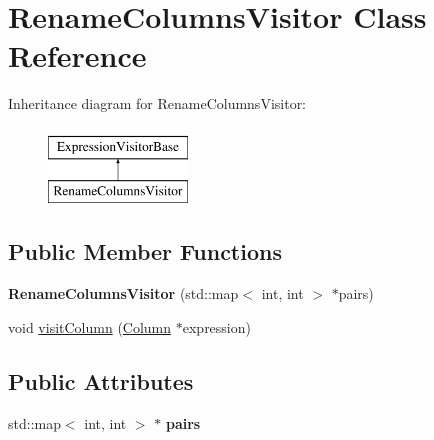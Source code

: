 \hypertarget{class_rename_columns_visitor}{\section{Rename\+Columns\+Visitor Class Reference}
\label{class_rename_columns_visitor}
}
Inheritance diagram for Rename\+Columns\+Visitor\+:\begin{figure}[H]
\begin{center}
\leavevmode
\includegraphics[height=2.000000cm]{class_rename_columns_visitor}
\end{center}
\end{figure}
\subsection*{Public Member Functions}
\begin{DoxyCompactItemize}
\item 
\hypertarget{class_rename_columns_visitor_a119cb79b414164ac4bb2adcfaf6bdcf9}{{\bfseries Rename\+Columns\+Visitor} (std\+::map$<$ int, int $>$ $\ast$pairs)}\label{class_rename_columns_visitor_a119cb79b414164ac4bb2adcfaf6bdcf9}

\item 
void \hyperlink{class_rename_columns_visitor_a45835dde3fa3190a803493a0e3f1e75a}{visit\+Column} (\hyperlink{class_column}{Column} $\ast$expression)
\end{DoxyCompactItemize}
\subsection*{Public Attributes}
\begin{DoxyCompactItemize}
\item 
\hypertarget{class_rename_columns_visitor_a40542b4f59af34a28e298d719ca426c1}{std\+::map$<$ int, int $>$ $\ast$ {\bfseries pairs}}\label{class_rename_columns_visitor_a40542b4f59af34a28e298d719ca426c1}

\end{DoxyCompactItemize}


